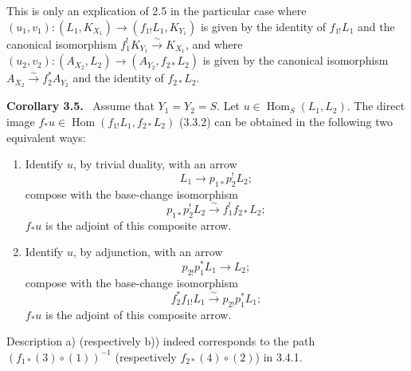 \documentclass[11pt]{article}
\newenvironment{statement}[1]{\par\medskip\noindent\textbf{#1.}\ }{\par\medskip}
\DeclareMathOperator{\Hom}{Hom}
\providecommand{\Hom}{\operatorname{Hom}}
\providecommand{\Hom}{\operatorname{Hom}}
\begin{document}
This is only an explication of 2.5 in the particular case where $(u_1,v_1):(L_1,K_{X_1})\to(f_{1!}L_1,K_{Y_1})$ is given by the identity of $f_{1!}L_1$ and the canonical isomorphism $f_1^!K_{Y_1}\xrightarrow{\sim}K_{X_1}$, and where $(u_2,v_2):(A_{X_2},L_2)\to(A_{Y_2},f_{2*}L_2)$ is given by the canonical isomorphism $A_{X_2}\xrightarrow{\sim}f_2^*A_{Y_2}$ and the identity of $f_{2*}L_2$.

\begin{statement}{Corollary 3.5}
Assume that $Y_1=Y_2=S$. Let $u\in\Hom_S(L_1,L_2)$. The direct image $f_*u\in\Hom(f_{1!}L_1,f_{2*}L_2)$ (3.3.2) can be obtained in the following two equivalent ways:
\end{statement}
\begin{enumerate}[label=\alph*)]
\item Identify $u$, by trivial duality, with an arrow
\[
L_1\longrightarrow p_{1*}p_2^!L_2;
\]
compose with the base-change isomorphism
\[
p_{1*}p_2^!L_2\xrightarrow{\sim}f_1^!f_{2*}L_2;
\]
$f_*u$ is the adjoint of this composite arrow.
\item Identify $u$, by adjunction, with an arrow
\[
p_{2!}p_1^*L_1\longrightarrow L_2;
\]
compose with the base-change isomorphism
\[
f_2^*f_{1!}L_1\xrightarrow{\sim}p_{2!}p_1^*L_1;
\]
$f_*u$ is the adjoint of this composite arrow.
\end{enumerate}
Description a) (respectively b)) indeed corresponds to the path $(f_{1*}(3)\circ(1))^{-1}$ (respectively $f_{2*}(4)\circ(2)$) in 3.4.1.
\end{document}
